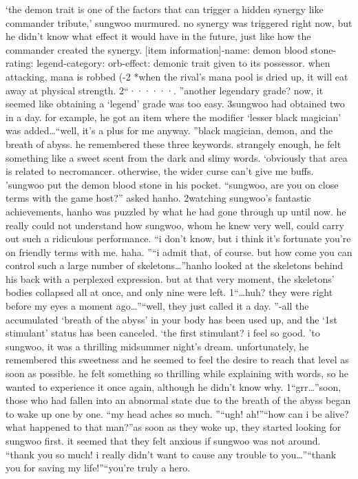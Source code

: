 ‘the demon trait is one of the factors that can trigger a hidden synergy like commander tribute,’ sungwoo murmured.
no synergy was triggered right now, but he didn’t know what effect it would have in the future, just like how the commander created the  synergy.
[item information]-name: demon blood stone-rating: legend-category: orb-effect: demonic trait given to its possessor.
 when attacking, mana is robbed (-2%
*when the rival’s mana pool is dried up, it will eat away at physical strength.
2“······.
”another legendary grade? now, it seemed like obtaining a ‘legend’ grade was too easy.
3sungwoo had obtained two in a day.
 for example, he got an item where the modifier ‘lesser black magician’ was added…“well, it’s a plus for me anyway.
”black magician, demon, and the breath of abyss.
 he remembered these three keywords.
 strangely enough, he felt something like a sweet scent from the dark and slimy words.
 ‘obviously that area is related to necromancer.
 otherwise, the wider curse can’t give me buffs.
’sungwoo put the demon blood stone in his pocket.
“sungwoo, are you on close terms with the game host?” asked hanho.
2watching sungwoo’s fantastic achievements, hanho was puzzled by what he had gone through up until now.
 he really could not understand how sungwoo, whom he knew very well, could carry out such a ridiculous performance.
“i don’t know, but i think it’s fortunate you’re on friendly terms with me.
 haha.
”“i admit that, of course.
 but how come you can control such a large number of skeletons…”hanho looked at the skeletons behind his back with a perplexed expression.
but at that very moment, the skeletons’ bodies collapsed all at once, and only nine were left.
1“…huh? they were right before my eyes a moment ago…”“well, they just called it a day.
”-all the accumulated ‘breath of the abyss’ in your body has been used up, and the ‘1st stimulant’ status has been canceled.
‘the first stimulant? i feel so good.
’to sungwoo, it was a thrilling midsummer night’s dream.
 unfortunately, he remembered this sweetness and he seemed to feel the desire to reach that level as soon as possible.
he felt something so thrilling while explaining with words, so he wanted to experience it once again, although he didn’t know why.
1“grr…”soon, those who had fallen into an abnormal state due to the breath of the abyss began to wake up one by one.
“my head aches so much.
”“ugh! ah!”“how can i be alive? what happened to that man?”as soon as they woke up, they started looking for sungwoo first.
 it seemed that they felt anxious if sungwoo was not around.
“thank you so much! i really didn’t want to cause any trouble to you…”“thank you for saving my life!”“you’re truly a hero.
